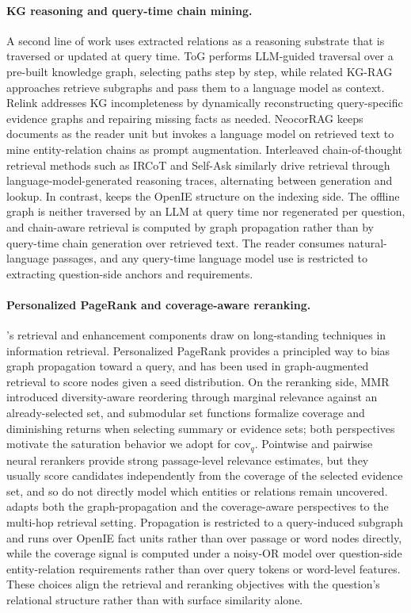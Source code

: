 \paragraph{KG reasoning and query-time chain mining.}
A second line of work uses extracted relations as a reasoning substrate
that is traversed or updated at query time. ToG \citep{sun2024tog}
performs LLM-guided traversal over a pre-built knowledge graph,
selecting paths step by step, while related KG-RAG approaches
\citep{baek2023kaping} retrieve subgraphs and pass them to a language
model as context. Relink \citep{huang2026relink} addresses KG
incompleteness by dynamically reconstructing query-specific evidence
graphs and repairing missing facts as needed. NeocorRAG
\citep{peng2026neocorrag} keeps documents as the reader unit but
invokes a language model on retrieved text to mine entity-relation
chains as prompt augmentation. Interleaved chain-of-thought retrieval
methods such as IRCoT \citep{trivedi2023ircot} and Self-Ask
\citep{press2023selfask} similarly drive retrieval through
language-model-generated reasoning traces, alternating between
generation and lookup. In contrast, \methodname{} keeps the OpenIE
structure on the indexing side. The offline graph is neither traversed
by an LLM at query time nor regenerated per question, and chain-aware
retrieval is computed by graph propagation rather than by query-time
chain generation over retrieved text. The reader consumes
natural-language passages, and any query-time language model use is
restricted to extracting question-side anchors and requirements.

\paragraph{Personalized PageRank and coverage-aware reranking.}
\methodname{}'s retrieval and enhancement components draw on
long-standing techniques in information retrieval. Personalized
PageRank \citep{haveliwala2002topic,jeh2003scaling} provides a
principled way to bias graph propagation toward a query, and has been
used in graph-augmented retrieval to score nodes given a seed
distribution. On the reranking side, MMR \citep{carbonell1998mmr}
introduced diversity-aware reordering through marginal relevance against
an already-selected set, and submodular set functions
\citep{lin2011submodular} formalize coverage and diminishing returns
when selecting summary or evidence sets; both perspectives motivate the
saturation behavior we adopt for $\mathrm{cov}_q$. Pointwise and
pairwise neural rerankers provide strong passage-level relevance
estimates, but they usually score candidates independently from the
coverage of the selected evidence set, and so do not directly model
which entities or relations remain uncovered. \methodname{} adapts both
the graph-propagation and the coverage-aware perspectives to the
multi-hop retrieval setting. Propagation is restricted to a query-induced
subgraph and runs over OpenIE fact units rather than over passage or
word nodes directly, while the coverage signal is computed under a
noisy-OR model over question-side entity-relation requirements rather
than over query tokens or word-level features. These choices align the
retrieval and reranking objectives with the question's relational
structure rather than with surface similarity alone.
